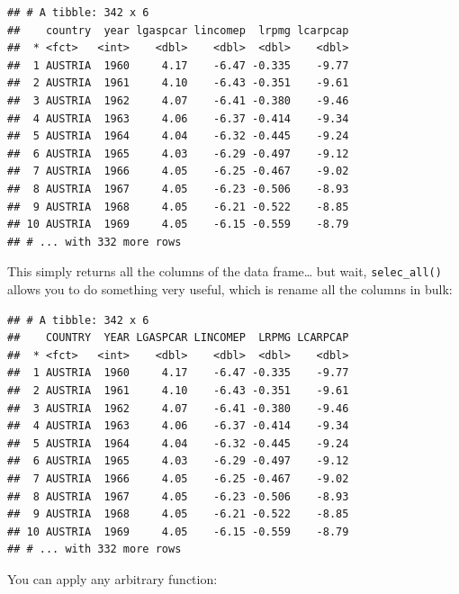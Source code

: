 \documentclass[]{gitbook}
\newenvironment{Shaded}{\begin{snugshade}}{\end{snugshade}}
\newcommand{\KeywordTok}[1]{\textcolor[rgb]{0.13,0.29,0.53}{\textbf{#1}}}
\newcommand{\NormalTok}[1]{#1}
\newcommand{\OperatorTok}[1]{\textcolor[rgb]{0.81,0.36,0.00}{\textbf{#1}}}
\newcommand{\StringTok}[1]{\textcolor[rgb]{0.31,0.60,0.02}{#1}}
\theoremstyle{definition}
\theoremstyle{definition}
\theoremstyle{definition}
\theoremstyle{remark}
\begin{document}
\begin{verbatim}
## # A tibble: 342 x 6
##    country  year lgaspcar lincomep  lrpmg lcarpcap
##  * <fct>   <int>    <dbl>    <dbl>  <dbl>    <dbl>
##  1 AUSTRIA  1960     4.17    -6.47 -0.335    -9.77
##  2 AUSTRIA  1961     4.10    -6.43 -0.351    -9.61
##  3 AUSTRIA  1962     4.07    -6.41 -0.380    -9.46
##  4 AUSTRIA  1963     4.06    -6.37 -0.414    -9.34
##  5 AUSTRIA  1964     4.04    -6.32 -0.445    -9.24
##  6 AUSTRIA  1965     4.03    -6.29 -0.497    -9.12
##  7 AUSTRIA  1966     4.05    -6.25 -0.467    -9.02
##  8 AUSTRIA  1967     4.05    -6.23 -0.506    -8.93
##  9 AUSTRIA  1968     4.05    -6.21 -0.522    -8.85
## 10 AUSTRIA  1969     4.05    -6.15 -0.559    -8.79
## # ... with 332 more rows
\end{verbatim}

This simply returns all the columns of the data frame\ldots{} but wait,
\texttt{selec\_all()} allows you to do something very useful, which is
rename all the columns in bulk:

\begin{Shaded}
\end{Shaded}

\begin{verbatim}
## # A tibble: 342 x 6
##    COUNTRY  YEAR LGASPCAR LINCOMEP  LRPMG LCARPCAP
##  * <fct>   <int>    <dbl>    <dbl>  <dbl>    <dbl>
##  1 AUSTRIA  1960     4.17    -6.47 -0.335    -9.77
##  2 AUSTRIA  1961     4.10    -6.43 -0.351    -9.61
##  3 AUSTRIA  1962     4.07    -6.41 -0.380    -9.46
##  4 AUSTRIA  1963     4.06    -6.37 -0.414    -9.34
##  5 AUSTRIA  1964     4.04    -6.32 -0.445    -9.24
##  6 AUSTRIA  1965     4.03    -6.29 -0.497    -9.12
##  7 AUSTRIA  1966     4.05    -6.25 -0.467    -9.02
##  8 AUSTRIA  1967     4.05    -6.23 -0.506    -8.93
##  9 AUSTRIA  1968     4.05    -6.21 -0.522    -8.85
## 10 AUSTRIA  1969     4.05    -6.15 -0.559    -8.79
## # ... with 332 more rows
\end{verbatim}

You can apply any arbitrary function:

\begin{Shaded}
\end{Shaded}
\end{document}
